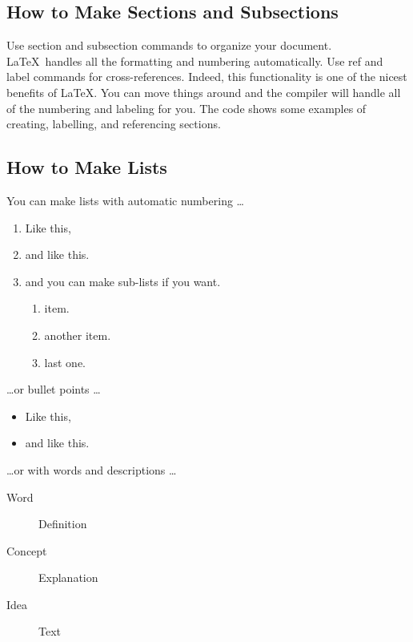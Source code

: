 \documentclass{article}
\begin{document}
\subsection{How to Make Sections and Subsections}

Use section and subsection commands to organize your document. \LaTeX\ handles all the formatting and numbering automatically. Use ref and label commands for cross-references.  Indeed, this functionality is one of the nicest benefits of \LaTeX .  You can move things around and the compiler will handle all of the numbering and labeling for you.  The code shows some examples of creating, labelling, and referencing sections.

\subsection{How to Make Lists}

You can make lists with automatic numbering \dots

\begin{enumerate}
\item Like this,
\item and like this.
\item and you can make sub-lists if you want.
\begin{enumerate}
\item item.
\item another item.
\item last one.
\end{enumerate}
\end{enumerate}
\dots or bullet points \dots
\begin{itemize}
\item Like this,
\item and like this.
\end{itemize}
\dots or with words and descriptions \dots
\begin{description}
\item[Word] Definition
\item[Concept] Explanation
\item[Idea] Text
\end{description}
\end{document}
